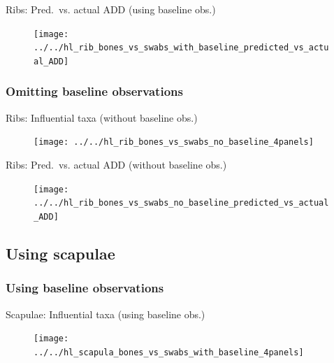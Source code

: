\documentclass{beamer}
\begin{document}
\begin{frame}{Ribs: Pred.\ vs. actual ADD (using baseline obs.)}

  \begin{center}
    \begin{figure}
      \texttt{[image: ../../hl\_rib\_bones\_vs\_swabs\_with\_baseline\_predicted\_vs\_actual\_ADD]}
    \end{figure}
  \end{center}
\end{frame}


\subsubsection[No baseline]{Omitting baseline observations}

\begin{frame}{Ribs: Influential taxa (without baseline obs.)}

  \begin{center}
    \begin{figure}
      \texttt{[image: ../../hl\_rib\_bones\_vs\_swabs\_no\_baseline\_4panels]}
    \end{figure}
  \end{center}

\end{frame}


\begin{frame}{Ribs: Pred.\ vs. actual ADD (without baseline obs.)}

  \begin{center}
    \begin{figure}
      \texttt{[image: ../../hl\_rib\_bones\_vs\_swabs\_no\_baseline\_predicted\_vs\_actual\_ADD]}
    \end{figure}
  \end{center}

\end{frame}


\subsection[Scapulae]{Using scapulae}

\subsubsection[With baseline]{Using baseline observations}

\begin{frame}{Scapulae: Influential taxa (using baseline obs.)}

  \begin{center}
    \begin{figure}
      \texttt{[image: ../../hl\_scapula\_bones\_vs\_swabs\_with\_baseline\_4panels]}
    \end{figure}
  \end{center}
  
\end{frame}
\end{document}
